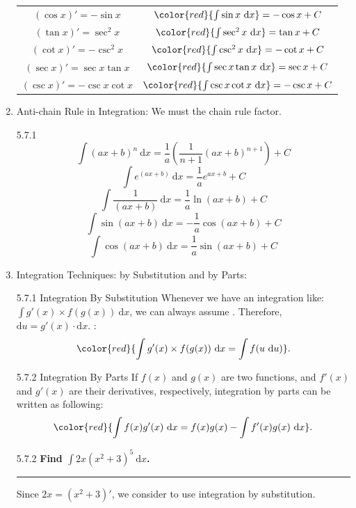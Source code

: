 \documentclass[12pt, a4paper]{article}
\begin{document}
\begin{enumerate}
\begin{center}
\begin{tabular}{c|c}
        $(\cos x)'=-\sin x$&${\color{red}{\int \sin x\ \mathrm{d}x}=-\cos x+C}$\\
        $(\tan x)'=\sec^2 x$&${\color{red}{\int \sec^2 x\ \mathrm{d}x}=\tan x+C}$\\
        $(\cot x)'=-\csc^2 x$&${\color{red}{\int \csc^2 x\ \mathrm{d}x}=-\cot x+C}$\\
        $(\sec x)'=\sec x\tan x$&${\color{red}{\int \sec x\tan x\ \mathrm{d}x}=\sec x+C}$\\
        $(\csc x)'=-\csc x\cot x$&${\color{red}{\int \csc x\cot x\ \mathrm{d}x}=-\csc x+C}$\\
    \end{tabular}\end{center}
    \item Anti-chain Rule in Integration: We must {\color{red}{divide}} the chain rule factor.
    \begin{example}{5.7.1}{}
        $$\int (ax+b)^n\ \mathrm{d}x=\frac{1}{a}\left(\frac{1}{n+1}(ax+b)^{n+1}\right)+C$$
        $$\int e^{(ax+b)}\ \mathrm{d}x=\frac{1}{a}e^{ax+b}+C$$
        $$\int \frac{1}{(ax+b)}\ \mathrm{d}x=\frac{1}{a}\ln(ax+b)+C$$
        $$\int \sin{(ax+b)}\ \mathrm{d}x=-\frac{1}{a}\cos(ax+b)+C$$
        $$\int \cos{(ax+b)}\ \mathrm{d}x=\frac{1}{a}\sin(ax+b)+C$$
    \end{example}
    \item Integration Techniques: by Substitution and by Parts: 
    \begin{theorem}{5.7.1 Integration By Substitution}{}
        Whenever we have an integration like: $\int g'(x)\times f(g(x))\ \mathrm{d}x$, we can always assume {\color{red}{$u=g(x)$}}. Therefore, $\mathrm{d}u=g'(x)\cdot\mathrm{d}x$. {}: 
        $${\color{red}{\int g'(x)\times f(g(x))\ \mathrm{d}x=\int f(u\ \mathrm{d}u)}}.$$
    \end{theorem}
    \begin{theorem}{5.7.2 Integration By Parts}{}
        If $f(x)$ and $g(x)$ are two functions, and $f'(x)$ and $g'(x)$ are their derivatives, respectively, integration by parts can be written as following:         $${\color{red}{\int f(x)g'(x)\ \mathrm{d}x=f(x)g(x)-\int f'(x)g(x)\ \mathrm{d}x}}.$$
    \end{theorem}
    \begin{example}{5.7.2}{}
        \textbf{Find $\int 2x(x^2+3)^5\ \mathrm{d}x$.}\\
        \noindent\rule[0.1pt]{\textwidth}{1pt}
        Since $2x=(x^2+3)'$, we consider to use integration by substitution. \\

\end{example}
\end{enumerate}
\end{document}
